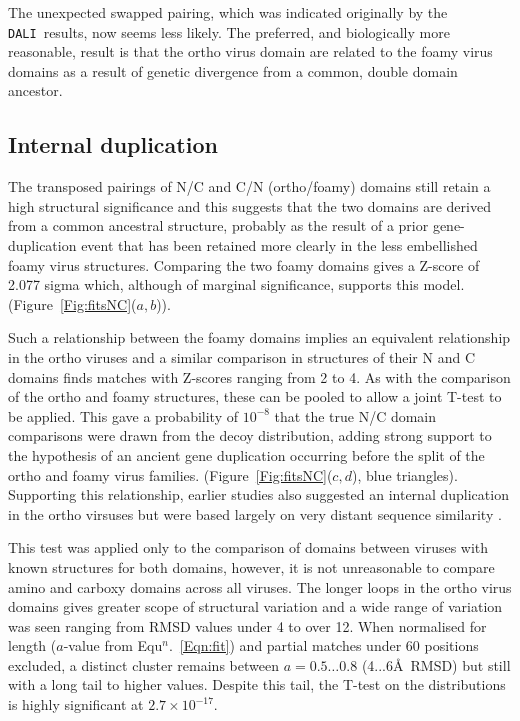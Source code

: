 \documentclass{bmcart}
\newcommand{\DALI}{{\tt DALI}}
\newcommand{\Fig}[1]{Figure~\ref{Fig:#1}}
\newcommand{\Eqn}[1]{Equ$^n$.~\ref{Eqn:#1}}
\begin{document}
The unexpected swapped pairing, which was indicated originally by the \DALI\ results, now seems
less likely.  The preferred, and biologically more reasonable, result is that the ortho virus
domain are related to the foamy virus domains as a result of genetic divergence from
a common, double domain ancestor.

\subsection*{Internal duplication}

The transposed pairings of N/C and C/N (ortho/foamy) domains still retain a high structural
significance and this suggests that the two domains are derived from a common ancestral structure,
probably as the result of a prior gene-duplication event that has been retained more clearly
in the less embellished foamy virus structures.   Comparing the two foamy domains gives
a Z-score of 2.077 sigma which, although of marginal significance, supports this model.
(\Fig{fitsNC}($a,b$)).

Such a relationship between the foamy domains implies an equivalent relationship
in the ortho viruses and a similar comparison in structures of their N and C domains
finds matches with Z-scores ranging from 2 to 4.   As with the comparison of the
ortho and foamy structures, these can be pooled to allow a joint T-test to be applied.
This gave a probability of $10^{-8}$ that the true N/C domain
comparisons were drawn from the decoy distribution, adding strong support to the
hypothesis of an ancient gene duplication occurring before the split of the ortho
and foamy virus families. (\Fig{fitsNC}($c,d$), blue triangles).
Supporting this relationship, earlier studies also suggested an internal duplication
in the ortho virsuses but were based largely on very distant sequence similarity
\cite{CampillosMet06}.

This test was applied only to the comparison of domains between viruses with
known structures for both domains, however, it is not unreasonable to compare
amino and carboxy domains across all viruses.  The longer loops in the ortho virus
domains gives greater scope of structural variation and a wide range of variation
was seen ranging from RMSD values under 4 to over 12.
When normalised for length ($a$-value from \Eqn{fit}) and partial matches under
60 positions excluded, a distinct cluster remains between $a=0.5\ldots0.8$ (4...6\AA\
RMSD) but still with a long tail to higher values.
Despite this tail, the T-test on the distributions is highly significant at $2.7 \times 10^{-17}$.
\end{document}
